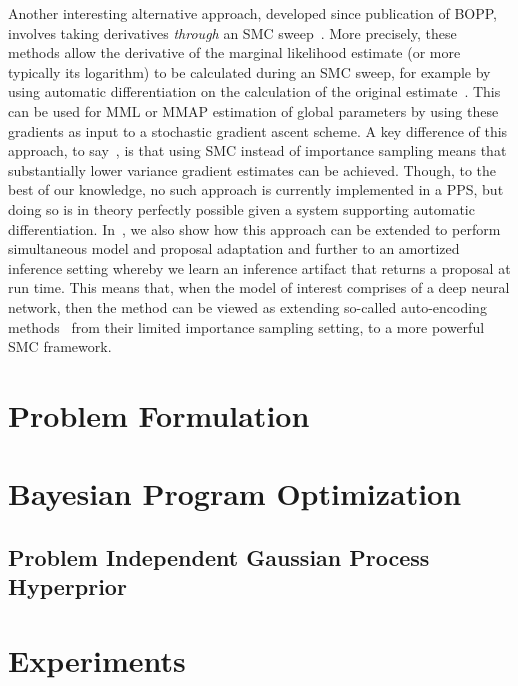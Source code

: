 Another interesting alternative approach,
developed since publication of BOPP, involves taking derivatives \emph{through} an SMC
sweep~\citep{le2017auto,naesseth2017variational,maddison2017filtering}. 
More precisely, these methods allow the derivative of the marginal likelihood estimate (or more typically
its logarithm) to be calculated during an SMC sweep, for example by using automatic differentiation
on the calculation of the original estimate~\citep{le2017auto}.  This can be used for MML or MMAP estimation
of global parameters by using these gradients as input to a stochastic gradient ascent scheme.
A key difference of this approach, to say~\cite{vandemeent2016black}, is that using SMC instead of importance
sampling means that substantially lower variance gradient estimates can be achieved.
Though, to the best of our knowledge, no such approach is currently implemented in a PPS, but doing so is 
in theory perfectly possible given a system supporting automatic differentiation.  
In~\cite{le2017auto}, we also show how this approach can be extended to perform simultaneous model
and proposal adaptation and further to an amortized inference setting whereby we learn an inference
artifact that returns a proposal at run time.  This means that, when the model of interest comprises of
a deep neural network, then the method can be viewed as extending so-called auto-encoding methods~\citep{kingma2014auto,burda2015importance}
from their limited importance sampling setting, to a more powerful SMC framework.

\section{Problem Formulation}
\label{sec:problem}



\section{Bayesian Program Optimization}
\label{sec:bopp}



\subsection{Problem Independent Gaussian Process Hyperprior}
\label{sec:app:hyperprior}



\section{Experiments}
\label{sec:bopp:exp}


